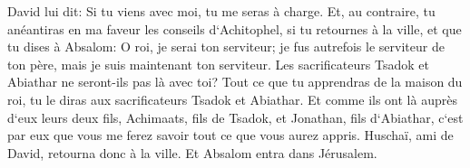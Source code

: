 \verse David lui dit: Si tu viens avec moi, tu me seras à charge. 
\verse Et, au contraire, tu anéantiras en ma faveur les conseils d`Achitophel, si tu retournes à la ville, et que tu dises à Absalom: O roi, je serai ton serviteur; je fus autrefois le serviteur de ton père, mais je suis maintenant ton serviteur. 
\verse Les sacrificateurs Tsadok et Abiathar ne seront-ils pas là avec toi? Tout ce que tu apprendras de la maison du roi, tu le diras aux sacrificateurs Tsadok et Abiathar. 
\verse Et comme ils ont là auprès d`eux leurs deux fils, Achimaats, fils de Tsadok, et Jonathan, fils d`Abiathar, c`est par eux que vous me ferez savoir tout ce que vous aurez appris. 
\verse Huschaï, ami de David, retourna donc à la ville. Et Absalom entra dans Jérusalem. 

\chapter{}

